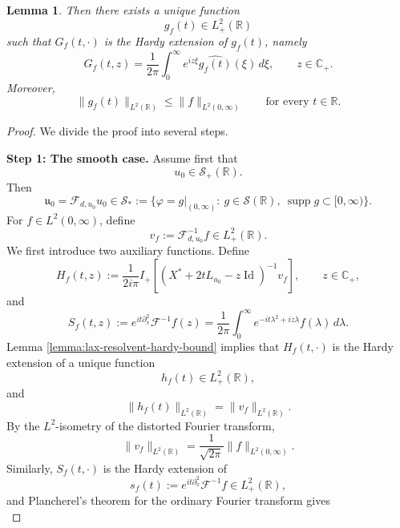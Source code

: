 \documentclass[10pt]{article}
\newtheorem{lemma}[theorem]{Lemma}
\numberwithin{equation}{section}
\numberwithin{theorem}{section}
\begin{document}
\begin{appendix}
\begin{lemma}
Then there exists a unique function
\[
g_f(t)\in L^2_+(\mathbb R)
\]
such that \(G_f(t,\cdot)\) is the Hardy extension of \(g_f(t)\), namely
\begin{equation}
\label{A.8.2}
G_f(t,z)
=
\frac1{2\pi}
\int_0^\infty
e^{iz\xi}\widehat{g_f(t)}(\xi)\,d\xi,
\qquad z\in\mathbb C_+ .
\end{equation}
Moreover,
\begin{equation}
\label{A.8.3}
\|g_f(t)\|_{L^2(\mathbb R)}
\le
\|f\|_{L^2(0,\infty)}
\qquad\text{for every }t\in\mathbb R.
\end{equation}
\end{lemma}

\begin{proof}
We divide the proof into several steps.

\medskip
\noindent
\textbf{Step 1: The smooth case.}
Assume first that
\[
u_0\in\mathcal S_+(\mathbb R).
\]
Then
\[
\mathfrak u_0=\mathcal F_{d,u_0}u_0\in\mathcal{S}_{*}:=\{\varphi=g|_{(0,\infty)}:\ g\in \mathcal{S}(\mathbb R),\
\operatorname{supp}g\subset[0,\infty)\}.
\]
For \(f\in L^2(0,\infty)\), define
\[
v_f:=\mathcal F_{d,u_0}^{-1}f\in L^2_+(\mathbb R).
\]
We first introduce two auxiliary functions. Define
\begin{equation}
\label{A.8.4}
H_f(t,z)
:=
\frac{1}{2i\pi}
I_+\left[
\left(X^*+2tL_{u_0}-z\operatorname{Id}\right)^{-1}v_f
\right],
\qquad z\in\mathbb C_+,
\end{equation}
and
\begin{equation}
\label{A.8.5}
S_f(t,z)
:=
e^{it\partial_x^2}\mathcal F^{-1}f(z)
=
\frac{1}{2\pi}
\int_0^\infty e^{-it\lambda^2+iz\lambda}f(\lambda)\,d\lambda .
\end{equation}
Lemma \ref{lemma:lax-resolvent-hardy-bound} implies that \(H_f(t,\cdot)\) is the Hardy extension of a unique
function
\[
h_f(t)\in L^2_+(\mathbb R),
\]
and
\begin{equation}
\label{A.8.6}
\|h_f(t)\|_{L^2(\mathbb R)}
=
\|v_f\|_{L^2(\mathbb R)}.
\end{equation}
By the \(L^2\)-isometry of the distorted Fourier transform,
\begin{equation}
\label{A.8.7}
\|v_f\|_{L^2(\mathbb R)}
=
\frac{1}{\sqrt{2\pi}}\|f\|_{L^2(0,\infty)}.
\end{equation}
Similarly, \(S_f(t,\cdot)\) is the Hardy extension of
\[
s_f(t):=e^{it\partial_x^2}\mathcal F^{-1}f\in L^2_+(\mathbb R),
\]
and Plancherel's theorem for the ordinary Fourier transform gives
\begin{equation}
\label{A.8.8}

\end{equation}
\end{proof}
\end{appendix}
\end{document}
